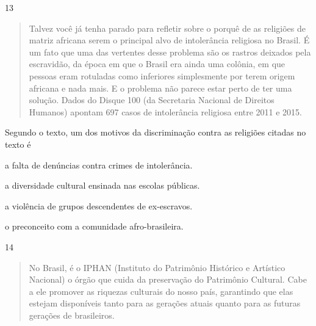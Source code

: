 
\num{13}

\begin{quote}
Talvez você já tenha parado para refletir sobre o porquê de as religiões de matriz africana serem o principal alvo de intolerância religiosa no Brasil.
É um fato que uma das vertentes desse problema são os rastros deixados pela escravidão, da época em que o Brasil era ainda uma colônia, em que pessoas eram rotuladas como inferiores simplesmente por terem origem africana e nada mais.
E o problema não parece estar perto de ter uma solução. Dados do Disque 100 (da Secretaria Nacional de Direitos Humanos) apontam 697 casos de intolerância religiosa entre 2011 e 2015.

\end{quote}

Segundo o texto, um dos motivos da discriminação contra as religiões
citadas no texto é

\begin{escolha}
\item a falta de denúncias contra crimes de intolerância.

\item a diversidade cultural ensinada nas escolas públicas.

\item a violência de grupos descendentes de ex-escravos.

\item o preconceito com a comunidade afro-brasileira.
\end{escolha}


\num{14}

\begin{quote}
No Brasil, é o IPHAN (Instituto do Patrimônio Histórico e Artístico Nacional) o órgão que cuida da preservação do Patrimônio Cultural. Cabe
a ele promover as riquezas culturais do nosso país, garantindo que elas estejam disponíveis tanto para as gerações atuais quanto para as futuras gerações de brasileiros.
\end{quote}

